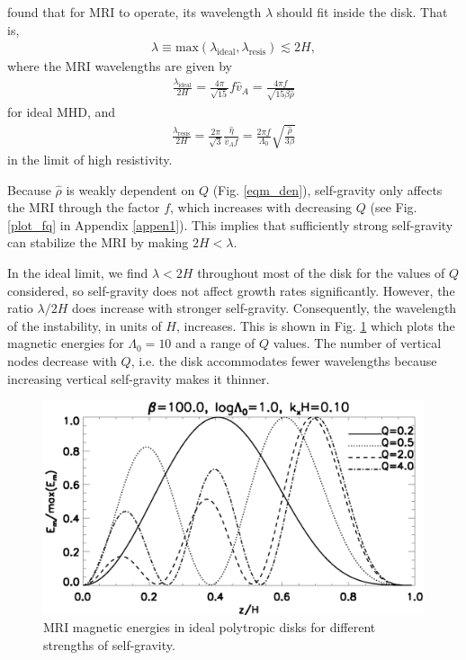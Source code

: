 \cite{sano99} found that for MRI to operate, its 
wavelength $\lambda$ should fit inside the disk. That is,   
\begin{align}\label{sano_crit}
  \lambda \equiv
  \mathrm{max}\left(\lambda_\mathrm{ideal},\lambda_\mathrm{resis}\right)\lesssim
  2H, 
\end{align}
where the MRI wavelengths are given by 
\begin{align}\label{lambda_ideal}
  \frac{\lambda_\mathrm{ideal}}{2H} = \frac{4\pi}{\sqrt{15}} f \hat{v}_A =
  \frac{4\pi f}{\sqrt{15\beta\hat{\rho}}}
\end{align}
for ideal MHD, and 
\begin{align}\label{lambda_resis}
  \frac{\lambda_\mathrm{resis}}{2H} = \frac{2\pi}{\sqrt{3}}\frac{\hat{\eta}}{\hat{v}_A f} =
  \frac{2\pi f}{\Lambda_0}\sqrt{\frac{\hat{\rho}}{3\beta}} 
\end{align}
in the limit of high resistivity.  
   
Because $\hat{\rho}$ is weakly dependent
on $Q$ (Fig. \ref{eqm_den}), self-gravity only affects the
MRI through the factor $f$, which increases with decreasing $Q$ (see
Fig. \ref{plot_fq} in Appendix \ref{appen1}).   
This implies that sufficiently strong self-gravity can stabilize the
MRI by making $ 2H<\lambda $.   
 
In the ideal limit, we find $\lambda < 2H$ throughout most of the disk
for the values of $Q$ considered, so self-gravity does not affect
growth rates significantly. However, the ratio $\lambda/2H$ does
increase with stronger self-gravity. Consequently, the wavelength of
the instability, in units of $H$, increases. This is shown in
Fig. \ref{compare_result_lambda10} which plots the magnetic energies
for $\Lambda_0=10$ and a range of $Q$ values. The number of vertical
nodes decrease with $Q$, i.e. the disk accommodates fewer wavelengths
because increasing vertical self-gravity makes it thinner. 

\begin{figure}
  \includegraphics[width=\linewidth]{figures/compare_result_lambda10}
  \caption{MRI magnetic energies in ideal polytropic disks
    for different strengths of self-gravity.    
    \label{compare_result_lambda10}}
\end{figure}


